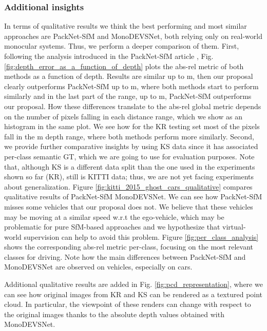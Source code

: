 \documentclass[journal]{IEEEtran}
\newcommand{\Fig}[1]{Fig. \ref{fig:#1}}
\begin{document}
\subsubsection{Additional insights}
In terms of qualitative results we think the best performing and most similar approaches are PackNet-SfM and MonoDEVSNet, both relying only on real-world monocular systems. Thus, we perform a deeper comparison of them. First, following the analysis introduced in the PackNet-SfM article \cite{Guizilini:20203D}, \Fig{depth_error_as_a_function_of_depth} plots the abs-rel metric of both methods as a function of depth. Results are similar up to m, then our proposal clearly outperforms PackNet-SfM up to m, where both methods start to perform similarly and in the last part of the range, up to m, PackNet-SfM outperforms our proposal. How these differences translate to the abs-rel global metric depends on the number of pixels falling in each distance range, which we show as an histogram in the same plot. We see how for the KR testing set most of the pixels fall in the m depth range, where both methods perform more similarly. Second, we provide further comparative insights by using KS data since it has associated per-class semantic GT, which we are going to use for evaluation purposes. Note that, although KS is a different data split than the one used in the experiments shown so far (KR), still is KITTI data; thus, we are not yet facing experiments about generalization. Figure \ref{fig:kitti_2015_ghost_cars_qualitative} compares qualitative results of PackNet-SfM {\vs} MonoDEVSNet. We can see how PackNet-SfM misses some vehicles that our proposal does not. We believe that these vehicles may be moving at a similar speed w.r.t the ego-vehicle, which may be problematic for pure SfM-based approaches and we hypothesize that virtual-world supervision can help to avoid this problem. Figure \ref{fig:per_class_analysis} shows the corresponding abs-rel metric per-class, focusing on the most relevant classes for driving. Note how the main differences between PackNet-SfM and MonoDEVSNet are observed on vehicles, especially on cars. 

Additional qualitative results are added in \Fig{pcd_representation}, where we can see how original images from KR and KS can be rendered as a textured point cloud. In particular, the viewpoint of these renders can change with respect to the original images thanks to the absolute depth values obtained with MonoDEVSNet.
\end{document}
